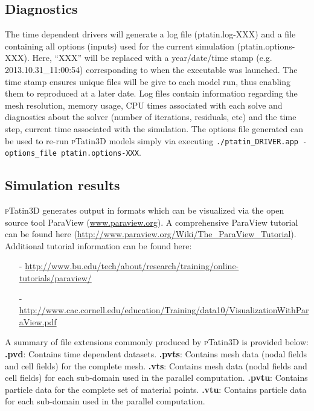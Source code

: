 \documentclass[paper=a4, fontsize=11pt,twoside]{scrartcl}
\newcommand{\ptat}{{{\textsc pTatin3D}}}
\newcommand{\unix}[1]{\texttt{\footnotesize #1}}
\begin{document}
{{\subsection{Diagnostics}
The time dependent drivers will generate a log file (ptatin.log-XXX) and a file containing all options (inputs) used for the current simulation (ptatin.options-XXX). Here, ``XXX'' will be replaced with a year/date/time stamp (e.g. 2013.10.31\_11:00:54) corresponding to when the executable was launched. The time stamp ensures unique files will be give to each model run, thus enabling them to reproduced at a later date. Log files contain information regarding the mesh resolution, memory usage, CPU times associated with each solve and diagnostics about the solver (number of iterations, residuals, etc) and the time step, current time associated with the simulation. The options file generated can be used to re-run {\ptat} models simply via executing \unix{./ptatin\_DRIVER.app -options\_file ptatin.options-XXX}.

\subsection{Simulation results}
{\ptat} generates output in formats which can be visualized via the open source tool ParaView (\url{www.paraview.org}).
A comprehensive ParaView tutorial can be found here (\url{http://www.paraview.org/Wiki/The\_ParaView\_Tutorial}). 
Additional tutorial information can be found here:
\begin{tiny}
\begin{itemize}
	\item[-] \url{http://www.bu.edu/tech/about/research/training/online-tutorials/paraview/}
	\item[-] \url{http://www.cac.cornell.edu/education/Training/data10/VisualizationWithParaView.pdf}
\end{itemize}
\end{tiny}

A summary of file extensions commonly produced by {\ptat} is provided below: \newline
{\bf *.pvd}: Contains time dependent datasets.  \newline
{\bf *.pvts}: Contains mesh data (nodal fields and cell fields) for the complete mesh.  \newline
{\bf *.vts}: Contains mesh data (nodal fields and cell fields) for each sub-domain used in the parallel computation.  \newline
{\bf *.pvtu}: Contains particle data for the complete set of material points.  \newline
{\bf *.vtu}: Contains particle data for each sub-domain used in the parallel computation. \newline

}}
\end{document}
